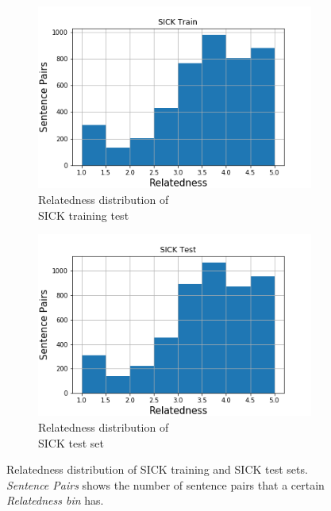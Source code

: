 \begin{enumerate}
\begin{figure}
	\captionsetup[subfigure]{justification=centering}
	\centering
	\begin{subfigure}[b]{.5\textwidth}
		\centering
		\includegraphics[width=\textwidth]{figures/semantic_textual_similarity/introduction/sick_train_relatedness_hist.png}
		\caption{Relatedness distribution of \\ SICK training test}
		\label{fig:sick_train_relatedness}
	\end{subfigure}%
	\begin{subfigure}[b]{.5\textwidth}
		\centering
		\includegraphics[width=\textwidth]{figures/semantic_textual_similarity/introduction/sick_test_relatedness_hist.png}
		\caption{Relatedness distribution of \\ SICK test set}
		\label{fig:sick_test_relatedness}
	\end{subfigure}
	\caption[Relatedness distribution of SICK training and SICK test sets]{Relatedness distribution of SICK training and SICK test sets. \textit{Sentence Pairs} shows the number of sentence pairs that a certain \textit{Relatedness bin} has.}
	\label{fig:sick_relatedness}
\end{figure}


\end{enumerate}
